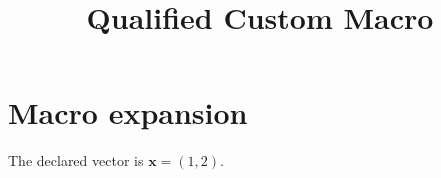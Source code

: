 \documentclass{article}
\title{Qualified Custom Macro}
\newcommand{\vect}[1]{\mathbf{#1}}
\begin{document}
\maketitle
\section{Macro expansion}
The declared vector is $\vect{x} = (1, 2)$.
\end{document}
